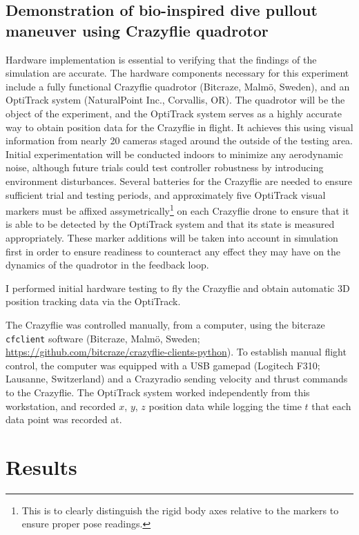 \documentclass[onecolumn,10pt]{IEEEtran}
\begin{document}
\subsection{Demonstration of bio-inspired dive pullout maneuver using Crazyflie quadrotor}
	Hardware implementation is essential to verifying that the findings of the simulation are accurate. The hardware components necessary for this experiment include a fully functional Crazyflie quadrotor (Bitcraze, Malm\"{o}, Sweden), and an OptiTrack system (NaturalPoint Inc., Corvallis, OR). The quadrotor will be the object of the experiment, and the OptiTrack system serves as a highly accurate way to obtain position data for the Crazyflie in flight. It achieves this using visual information from nearly 20 cameras staged around the outside of the testing area. Initial experimentation will be conducted indoors to minimize any aerodynamic noise, although future trials could test controller robustness by introducing environment disturbances. Several batteries for the Crazyflie are needed to ensure sufficient trial and testing periods, and approximately five OptiTrack visual markers must be affixed assymetrically\footnote{This is to clearly distinguish the rigid body axes relative to the markers to ensure proper pose readings.} on each Crazyflie drone to ensure that it is able to be detected by the OptiTrack system and that its state is measured appropriately. These marker additions will be taken into account in simulation first in order to ensure readiness to counteract any effect they may have on the dynamics of the quadrotor in the feedback loop.

I performed initial hardware testing to fly the Crazyflie and obtain automatic 3D position tracking data via the OptiTrack. 

The Crazyflie was controlled manually, from a computer, using the bitcraze \lstinline{cfclient} software (Bitcraze, Malm\"{o}, Sweden; \url{https://github.com/bitcraze/crazyflie-clients-python}). To establish manual flight control, the computer was equipped with a USB gamepad (Logitech F310; Lausanne, Switzerland) and a Crazyradio sending velocity and thrust commands to the Crazyflie. The OptiTrack system worked independently from this workstation, and recorded $x$, $y$, $z$ position data while logging the time $t$ that each data point was recorded at. 







\section{Results}
\end{document}
